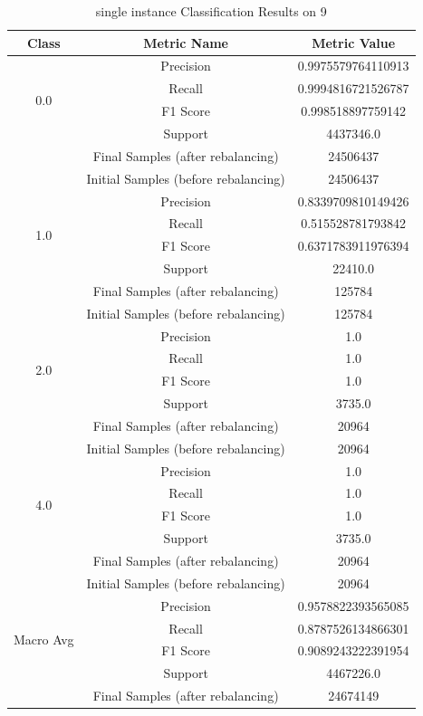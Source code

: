 \begin{longtable}{|c|c|c|}
\caption{single instance Classification Results on 9} \label{tab:9_single_instance_classifiers_results} \\
\hline
Class & Metric Name & Metric Value \\
\hline
\multirow{4}{*}{0.0} & Precision & 0.9975579764110913 \\
 & Recall & 0.9994816721526787 \\
 & F1 Score & 0.998518897759142 \\
 & Support & 4437346.0 \\
 & Final Samples (after rebalancing) & 24506437 \\
 & Initial Samples (before rebalancing) & 24506437 \\
\hline
\multirow{4}{*}{1.0} & Precision & 0.8339709810149426 \\
 & Recall & 0.515528781793842 \\
 & F1 Score & 0.6371783911976394 \\
 & Support & 22410.0 \\
 & Final Samples (after rebalancing) & 125784 \\
 & Initial Samples (before rebalancing) & 125784 \\
\hline
\multirow{4}{*}{2.0} & Precision & 1.0 \\
 & Recall & 1.0 \\
 & F1 Score & 1.0 \\
 & Support & 3735.0 \\
 & Final Samples (after rebalancing) & 20964 \\
 & Initial Samples (before rebalancing) & 20964 \\
\hline
\multirow{4}{*}{4.0} & Precision & 1.0 \\
 & Recall & 1.0 \\
 & F1 Score & 1.0 \\
 & Support & 3735.0 \\
 & Final Samples (after rebalancing) & 20964 \\
 & Initial Samples (before rebalancing) & 20964 \\
\hline
\multirow{4}{*}{Macro Avg} & Precision & 0.9578822393565085 \\
 & Recall & 0.8787526134866301 \\
 & F1 Score & 0.9089243222391954 \\
 & Support & 4467226.0 \\
 & Final Samples (after rebalancing) & 24674149 \\

\end{longtable}
